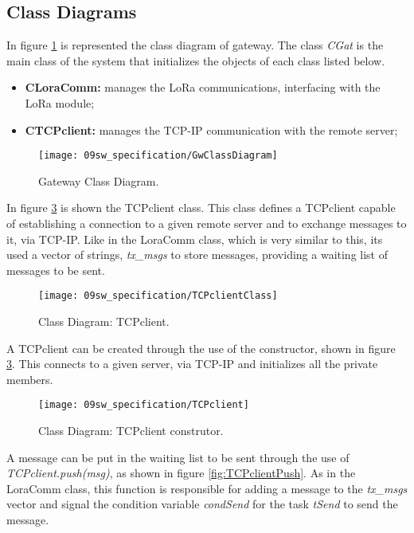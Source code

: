 \subsection{Class Diagrams}
In figure \ref{fig:GwclassDiag} is represented the class diagram of gateway. The class \textit{CGat} is the main class of the system that initializes the objects of each class listed below.

\begin{itemize}
	\item \textbf{CLoraComm:} manages the LoRa communications, interfacing with the LoRa module;
	
	\item \textbf{CTCPclient:} manages the TCP-IP communication with the remote server;
\end{itemize}

\begin{figure}[H]
	\centering
	\texttt{[image: 09sw\_specification/GwClassDiagram]}
	\caption{Gateway Class Diagram.}
	\label{fig:GwclassDiag}
\end{figure}

In figure \ref{fig:TCPclient} is shown the TCPclient class. This class defines a TCPclient capable of establishing a connection to a given remote server and to exchange messages to it, via TCP-IP. Like in the LoraComm class, which is very similar to this, its used a vector of strings, \textit{tx\_msgs} to store messages, providing a waiting list of messages to be sent.

\begin{figure}[H]
	\centering
	\texttt{[image: 09sw\_specification/TCPclientClass]}
	\caption{Class Diagram: TCPclient.}
	\label{fig:TCPclientClass}
\end{figure}

A TCPclient can be created through the use of the constructor, shown in figure \ref{fig:TCPclient}. This connects to a given server, via TCP-IP and initializes all the private members.

\begin{figure}[H]
	\centering
	\texttt{[image: 09sw\_specification/TCPclient]}
	\caption{Class Diagram: TCPclient construtor.}
	\label{fig:TCPclient}
\end{figure}

A message can be put in the waiting list to be sent through the use of \textit{TCPclient.push(msg)}, as shown in figure \ref{fig:TCPclientPush}. As in the LoraComm class, this function is responsible for adding a message to the \textit{tx\_msgs} vector and signal the condition variable \textit{condSend} for the task \textit{tSend} to send the message.

